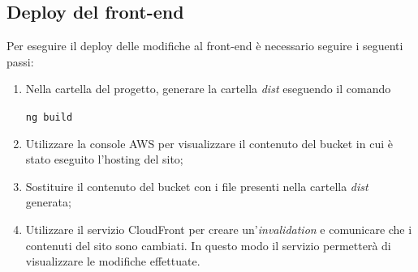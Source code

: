 	\subsection{Deploy del front-end}
	Per eseguire il \gls{deploy} delle modifiche al front-end è necessario seguire i seguenti passi:
	\begin{enumerate}
		\item Nella cartella del progetto, generare la cartella \emph{dist} eseguendo il comando
		\begin{center}
			\texttt{ng build}
		\end{center}
		\item Utilizzare la console \gls{AWS} per visualizzare il contenuto del bucket in cui è stato eseguito l'hosting del sito;
		\item Sostituire il contenuto del bucket con i file presenti nella cartella \emph{dist} generata;
		\item Utilizzare il servizio \gls{CloudFront} per creare un'\emph{invalidation} e comunicare che i
		contenuti del sito sono cambiati. In questo modo il servizio permetterà di visualizzare le modifiche effettuate.
	\end{enumerate}